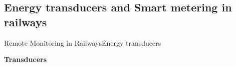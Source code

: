 \subsection{Energy transducers and Smart metering in railways}

\begin{frame}{Remote Monitoring in Railways}{Energy transducers}

	\begin{block}{\textbf{Transducers}}
	
		

\end{block}
\end{frame}
